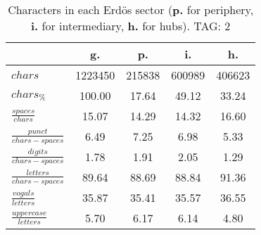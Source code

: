 \begin{table}[h!]
\begin{center}
\begin{tabular}{| l || c | c | c | c |}\hline
 & {\bf g.} & {\bf p.} & {\bf i.} & {\bf h.} \\\hline\hline
$chars$ & 1223450  & 215838  & 600989  & 406623 \\
$chars_{\%}$ & 100.00  & 17.64  & 49.12  & 33.24 \\\hline
$\frac{spaces}{chars}$ & 15.07  & 14.29  & 14.32  & 16.60 \\
$\frac{punct}{chars-spaces}$ & 6.49  & 7.25  & 6.98  & 5.33 \\
$\frac{digits}{chars-spaces}$ & 1.78  & 1.91  & 2.05  & 1.29 \\\hline
$\frac{letters}{chars-spaces}$ & 89.64  & 88.69  & 88.84  & 91.36 \\
$\frac{vogals}{letters}$ & 35.87  & 35.41  & 35.57  & 36.55 \\
$\frac{uppercase}{letters}$ & 5.70  & 6.17  & 6.14  & 4.80 \\\hline
\end{tabular}
\caption{Characters in each Erd\"os sector ({{\bf p.}} for periphery, {{\bf i.}} for intermediary, 
    {{\bf h.}} for hubs). TAG: 2}
\end{center}
\end{table}